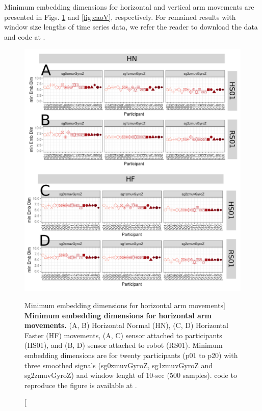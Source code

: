 Minimum embedding dimensions for horizontal and vertical arm movements
are presented in Figs.  \ref{fig:caoH} and \ref{fig:caoV}, respectively.
For remained  results with window size lengths of time series data, we refer
the reader to download the data and code at \cite{xochicale2018}.


\begin{figure}
\centering
\includegraphics[width=1.0\textwidth]{cao_aHw10}
	\caption
	[Minimum embedding dimensions for horizontal arm movements]{
	{\bf Minimum embedding dimensions for horizontal arm movements.} 
		(A, B) Horizontal Normal (HN), (C, D) Horizontal Faster (HF) 
		movements,
		(A, C) sensor attached to participants (HS01), and
		(B, D) sensor attached to robot (RS01).
		Minimum embedding dimensions are for twenty participants 
		(p01 to p20) with three smoothed signals 
		(sg0zmuvGyroZ, sg1zmuvGyroZ and sg2zmuvGyroZ)
		and window lenght of 10-sec (500 samples).
	\R code to reproduce the figure is available at 
	.
        }
    \label{fig:caoH}
\end{figure}

